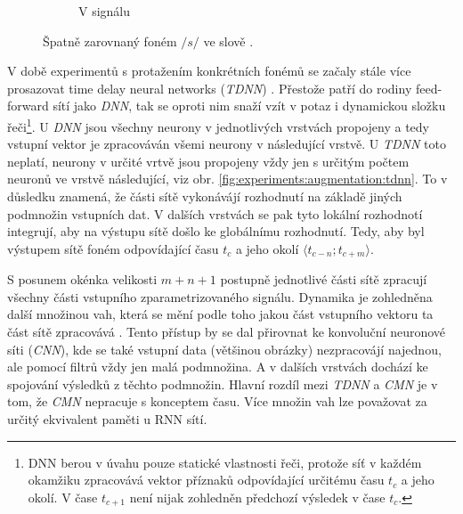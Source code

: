 \begin{figure}[htpb]
\begin{subfigure}[b]{0.55\textwidth}
    \caption{V signálu}
    \label{fig:experiments:augmentation:alignemnt:wrong:audio}
  \end{subfigure}
  \caption{Špatně zarovnaný foném $/s/$ ve slově .}
  \label{fig:experiments:augmentation:alignemnt:wrong}
\end{figure}


V době experimentů s protažením konkrétních fonémů se začaly stále více prosazovat time delay neural networks (\textit{TDNN}) . Přestože patří do rodiny feed-forward sítí jako \textit{DNN},  tak se oproti nim snaží vzít v potaz i dynamickou složku řeči\footnote{DNN berou v úvahu pouze statické vlastnosti řeči, protože síť v každém okamžiku zpracovává vektor příznaků odpovídající určitému času $t_c$ a jeho okolí. V čase $t_{c+1}$ není nijak zohledněn předchozí výsledek v čase $t_c$.}. U \textit{DNN} jsou všechny neurony v jednotlivých vrstvách propojeny a tedy vstupní vektor je zpracováván všemi neurony v následující vrstvě. U \textit{TDNN} toto neplatí, neurony v určité vrtvě jsou propojeny vždy jen s určitým počtem neuronů ve vrstvě následující, viz obr. \ref{fig:experiments:augmentation:tdnn}. To v důsledku znamená, že části sítě vykonávájí rozhodnutí na základě jiných podmnožin vstupních dat. V dalších vrstvách se pak tyto lokální rozhodnotí integrují, aby na výstupu sítě došlo ke globálnímu rozhodnutí. Tedy, aby byl výstupem sítě foném odpovídající času $t_c$ a jeho okolí $\langle t_{c-n}; t_{c+m} \rangle$.

S posunem okénka velikosti $m + n + 1$ postupně jednotlivé části sítě zpracují všechny části vstupního zparametrizovaného signálu. Dynamika je zohledněna další množinou vah, která se mění podle toho jakou část vstupního vektoru ta část sítě zpracovává \cite{Waibel1989}. Tento přístup by se dal přirovnat ke konvoluční neuronové síti (\textit{CNN}), kde se také vstupní data (většinou obrázky) nezpracovájí najednou, ale pomocí filtrů vždy jen malá podmnožina. A v dalších vrstvách dochází ke spojování výsledků z těchto podmnožin. Hlavní rozdíl mezi \textit{TDNN} a \textit{CMN}  je v tom, že \textit{CMN}  nepracuje s konceptem času. Více množin vah lze považovat za určitý ekvivalent paměti u RNN sítí.

